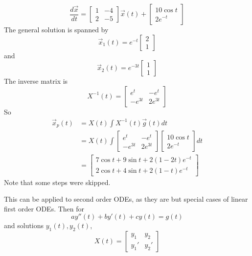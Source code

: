 \documentclass[12pt]{article}
\begin{document}
\begin{ex}
	$$\frac{d\vec{x}}{dt} = \begin{bmatrix} 1 & -4 \\ 2 & -5\end{bmatrix}\vec{x}(t) + \begin{bmatrix} 10\cos t \\ 2e^{-t}\end{bmatrix}$$
	The general solution is spanned by
	$$\vec{x}_1(t) = e^{-t}\begin{bmatrix} 2 \\ 1\end{bmatrix}$$
	and
	$$\vec{x}_2(t) = e^{-3t}\begin{bmatrix} 1 \\ 1\end{bmatrix}$$
	The inverse matrix is
	$$X^{-1}(t) = \begin{bmatrix} e^t & -e^t \\ -e^{3t} & 2e^{3t}\end{bmatrix}$$
	So
	\begin{align*}
		\vec{x}_p(t) &= X(t)\int X^{-1}(t)\vec{g}(t)dt \\
			     &= X(t)\int\begin{bmatrix} e^t & -e^t \\ -e^{3t} & 2e^{3t}\end{bmatrix}\begin{bmatrix} 10\cos t \\ 2e^{-t}\end{bmatrix}dt \\
			     &= \begin{bmatrix}7\cos t + 9\sin t + 2(1-2t)e^{-t} \\ 2\cos t + 4\sin t + 2(1-t)e^{-t}\end{bmatrix}
	\end{align*}
	Note that some steps were skipped.
\end{ex}

This can be applied to second order ODEs, as they are but special cases of linear first order ODEs. Then for
$$ay''(t) + by'(t) + cy(t) = g(t)$$
and solutions $y_1(t), y_2(t)$,
$$X(t) = \begin{bmatrix} y_1 & y_2 \\ y_1' & y_2'\end{bmatrix}$$
\end{document}
